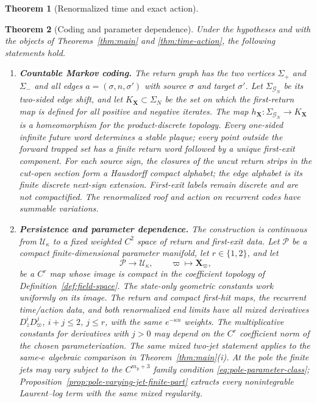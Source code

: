 \documentclass[11pt]{amsart}
\numberwithin{equation}{section}
\newtheorem{theorem}{Theorem}[section]
\theoremstyle{definition}
\theoremstyle{remark}
\newcommand{\cU}{\mathcal U}
\begin{document}
\begin{theorem}[Renormalized time and exact action]
\begin{enumerate}
\end{enumerate}
\end{theorem}

\begin{theorem}[Coding and parameter dependence]
\label{thm:coding-persistence}
Under the hypotheses and with the objects of Theorems~\ref{thm:main} and
\ref{thm:time-action}, the following statements hold.
\begin{enumerate}
\renewcommand{\labelenumi}{\textup{(\roman{enumi})}}
\item \textup{\textbf{Countable Markov coding.}}
The return graph has the two vertices $\Sigma_+$ and $\Sigma_-$ and all edges
$a=(\sigma,n,\sigma')$ with source $\sigma$ and target $\sigma'$.
Let $\Sigma_{\mathcal G_N}$ be its two-sided edge shift, and let
$K_{\mathbf X}\subset\Sigma_N$ be the set on which the first-return map is
defined for all positive and negative iterates.  The map
$h_{\mathbf X}:\Sigma_{\mathcal G_N}\to K_{\mathbf X}$ is a homeomorphism
for the product-discrete topology.  Every one-sided infinite future word
determines a stable plaque; every point outside the forward trapped set has
a finite return word followed by a unique first-exit component.  For each
source sign, the closures of the uncut return strips in the cut-open section
form a Hausdorff compact alphabet; the edge alphabet is its finite discrete
next-sign extension.  First-exit labels remain discrete and are not
compactified.  The renormalized roof and action on recurrent codes have
summable variations.

\item \textup{\textbf{Persistence and parameter dependence.}}
The construction is continuous from $\cU_\kappa$ to a fixed weighted
$C^2$ space of return and first-exit data.  Let $\mathcal P$ be a compact
finite-dimensional parameter manifold, let $r\in\{1,2\}$, and let
\[
 \mathcal P\longrightarrow\cU_\kappa,
 \qquad \varpi\longmapsto\mathbf X_\varpi,
\]
be a $C^r$ map whose image is compact in the coefficient topology of
Definition~\ref{def:field-space}.  The state-only geometric constants work
uniformly on its image.  The return and compact first-hit maps, the
recurrent time/action data, and both renormalized end limits have all mixed
derivatives $D_z^iD_\varpi^j$, $i+j\le2$, $j\le r$, with the same
$e^{-\kappa n}$ weights.  The multiplicative constants for derivatives
with $j>0$ may depend on the $C^r$ coefficient norm of the chosen
parameterization.  The same mixed two-jet statement applies to the
same-$e$ algebraic comparison in Theorem~\ref{thm:main}\textup{(i)}.  At
the pole the finite jets may vary subject to the
$C^{m_{\mathrm p}+3}$ family condition
\eqref{eq:pole-parameter-class};
Proposition~\ref{prop:pole-varying-jet-finite-part} extracts every
nonintegrable Laurent--log term with the same mixed regularity.

\end{enumerate}
\end{theorem}
\end{document}
